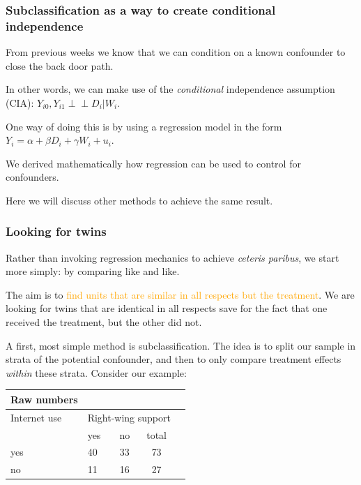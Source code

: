 \documentclass[12pt,english,dvipsnames,aspectratio=169,handout]{beamer}\usepackage[]{graphicx}\usepackage[]{xcolor}
\newcommand{\indep}{\perp \!\!\!\! \perp}
\begin{document}
\begin{frame}
  \frametitle{Subclassification as a way to create conditional independence}
\footnotesize

From previous weeks we know that we can condition on a known confounder to close the back door path.

In other words, we can make use of the \emph{conditional} independence assumption (CIA): $Y_{i0},Y_{i1} {\indep} D_i|W_i$.

One way of doing this is by using a regression model in the form $Y_i = \alpha + \beta D_i + \gamma W_i + u_i$.

We derived mathematically how regression can be used to control for confounders. 

Here we will discuss other methods to achieve the same result.

\end{frame}




\begin{frame}
  \frametitle{Looking for twins}
\footnotesize

Rather than invoking regression mechanics to achieve \emph{ceteris paribus}, we start more simply: by comparing like and like.

The aim is to \textcolor{orange}{find units that are similar in all respects but the treatment}. We are looking for twins that are identical in all respects save for the fact that one received the treatment, but the other did not.

A first, most simple method is subclassification. The idea is to split our sample in strata of the potential confounder, and then to only compare treatment effects \emph{within} these strata. Consider our example:

\tiny
\begin{table}\centering
\begin{tabular}{l*{1}{lccc}}
\toprule
Raw numbers                                  &         &         &         \\
\midrule
Internet use
                                             &\multicolumn{3}{c}{Right-wing support} \\
                                             &     yes&       no&      total    \\
yes                                          &      40&       33&         73     \\
no                                           &      11&       16&         27     \\
\bottomrule
\end{tabular}
\end{table}

\end{frame}
\end{document}
